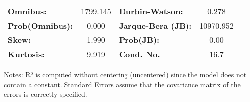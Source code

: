 \begin{center}
\begin{tabular}{lcccccc}
\bottomrule
\end{tabular}
\begin{tabular}{lclc}
\textbf{Omnibus:}       & 1799.145 & \textbf{  Durbin-Watson:     } &     0.278  \\
\textbf{Prob(Omnibus):} &   0.000  & \textbf{  Jarque-Bera (JB):  } & 10970.952  \\
\textbf{Skew:}          &   1.990  & \textbf{  Prob(JB):          } &      0.00  \\
\textbf{Kurtosis:}      &   9.919  & \textbf{  Cond. No.          } &      16.7  \\
\bottomrule
\end{tabular}
\end{center}

Notes: \newline
 [1] R² is computed without centering (uncentered) since the model does not contain a constant. \newline
 [2] Standard Errors assume that the covariance matrix of the errors is correctly specified.